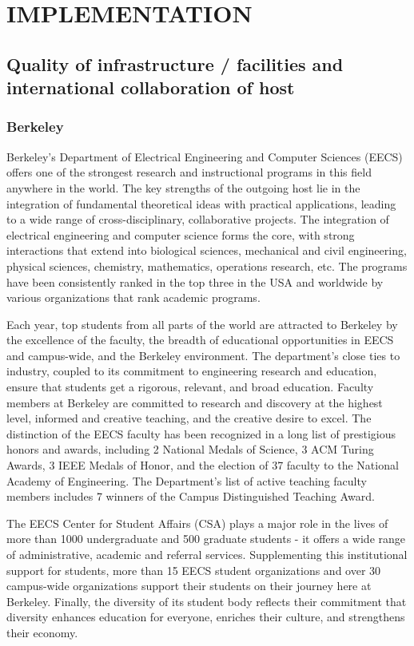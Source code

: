 \section{IMPLEMENTATION} %
\label{sec:implementation}
\subsection{Quality of infrastructure / facilities and international collaboration of host} 
\subsubsection{Berkeley}
Berkeley's Department of  Electrical Engineering and Computer Sciences
(EECS) offers one of the strongest research and instructional programs
in this field anywhere in the world. The key strengths of the outgoing
host  lie in  the integration  of fundamental  theoretical  ideas with
practical applications, leading to a wide range of cross-disciplinary,
collaborative projects. The  integration of electrical engineering and
computer science forms the  core, with strong interactions that extend
into biological  sciences, mechanical and  civil engineering, physical
sciences,  chemistry,  mathematics,   operations  research,  etc.  The
programs have been consistently ranked in the top three in the USA and
worldwide by various organizations that rank academic programs.

Each year, top  students from all parts of the  world are attracted to
Berkeley by the excellence of  the faculty, the breadth of educational
opportunities   in   EECS    and   campus-wide,   and   the   Berkeley
environment. The  department's close ties to industry,  coupled to its
commitment to engineering research and education, ensure that students
get  a rigorous,  relevant, and  broad education.  Faculty  members at
Berkeley are committed to research and discovery at the highest level,
informed and creative teaching, and  the creative desire to excel. The
distinction of the EECS faculty has  been recognized in a long list of
prestigious honors and awards, including 2 National Medals of Science,
3 ACM  Turing Awards, 3 IEEE Medals  of Honor, and the  election of 37
faculty to the National  Academy of Engineering. The Department's list
of active  teaching faculty members  includes 7 winners of  the Campus
Distinguished Teaching Award.

The EECS  Center for Student Affairs  (CSA) plays a major  role in the
lives of more  than 1000 undergraduate and 500  graduate students - it
offers  a   wide  range  of  administrative,   academic  and  referral
services. Supplementing this  institutional support for students, more
than   15  EECS   student  organizations   and  over   30  campus-wide
organizations  support   their  students   on  their  journey   here  at
Berkeley.  Finally, the  diversity of  its student  body  reflects their
commitment  that diversity enhances  education for  everyone, enriches
their culture, and strengthens their economy.
